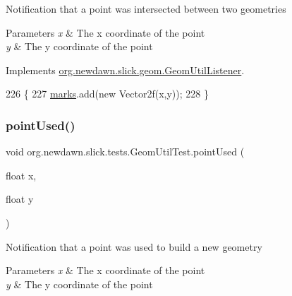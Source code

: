 Notification that a point was intersected between two geometries


\begin{DoxyParams}{Parameters}
{\em x} & The x coordinate of the point \\
\hline
{\em y} & The y coordinate of the point \\
\hline
\end{DoxyParams}


Implements \mbox{\hyperlink{interfaceorg_1_1newdawn_1_1slick_1_1geom_1_1_geom_util_listener_aac2e6eb21b135b8af600cbd2fa0b1402}{org.\+newdawn.\+slick.\+geom.\+Geom\+Util\+Listener}}.


\begin{DoxyCode}
226                                                    \{
227         \mbox{\hyperlink{classorg_1_1newdawn_1_1slick_1_1tests_1_1_geom_util_test_a316d1f8e9dcf90bc91c007a42184cd37}{marks}}.add(\textcolor{keyword}{new} Vector2f(x,y));
228     \}
\end{DoxyCode}
\mbox{\label{classorg_1_1newdawn_1_1slick_1_1tests_1_1_geom_util_test_a9a79bf3f2f9433b99402f42c34daf4c9}} 
\subsubsection{\texorpdfstring{point\+Used()}{pointUsed()}}
{\footnotesize\ttfamily void org.\+newdawn.\+slick.\+tests.\+Geom\+Util\+Test.\+point\+Used (\begin{DoxyParamCaption}\item[{float}]{x,  }\item[{float}]{y }\end{DoxyParamCaption})\hspace{0.3cm}{\ttfamily [inline]}}

Notification that a point was used to build a new geometry


\begin{DoxyParams}{Parameters}
{\em x} & The x coordinate of the point \\
\hline
{\em y} & The y coordinate of the point \\
\hline
\end{DoxyParams}


